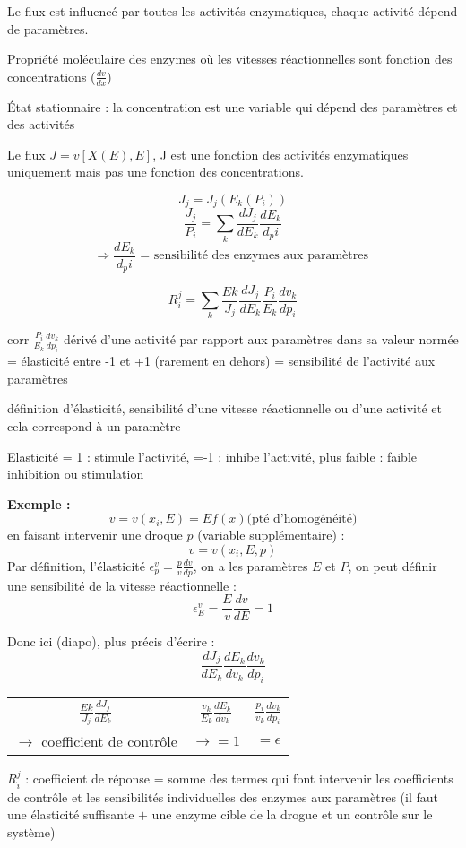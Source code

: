 Le flux est influencé par toutes les activités enzymatiques, chaque activité dépend de paramètres.

Propriété moléculaire des enzymes où les vitesses réactionnelles sont fonction des concentrations ($\frac{dv}{dx}$)

État stationnaire : la concentration est une variable qui dépend des paramètres et des activités

Le flux $J = v[X(E),E]$, J est une fonction des activités enzymatiques uniquement mais pas une fonction des concentrations. 
 	
$$ J_j = J_j(E_k(P_i))$$
$$ \frac{J_j}{P_i}= \sum_k \frac{dJ_j}{dE_k} \frac{dE_k}{d_pi} $$
$$ \Rightarrow \frac{dE_k}{d_pi}\text{ = sensibilité des enzymes aux paramètres }$$


$$ R^j_i = \sum_k \frac{Ek}{J_j}\frac{dJ_j}{dE_k}\frac{P_i}{E_k}\frac{dv_k}{dp_i}  $$

corr $\frac{P_i}{E_k}\frac{dv_k}{dp_i}$ dérivé d'une activité par rapport aux paramètres dans sa valeur normée = élasticité entre -1 et +1 (rarement en dehors) = sensibilité de l'activité aux paramètres 

\Rightarrow définition d'élasticité, sensibilité d'une vitesse réactionnelle ou d'une activité et cela correspond à un paramètre

Elasticité = 1 : stimule l'activité, =-1 : inhibe l'activité, plus faible : faible inhibition ou stimulation


\textbf{Exemple :}
$$ v = v(x_i, E) = E f(x) \text{(pté d'homogénéité)} $$
 en faisant intervenir une droque $p$ (variable supplémentaire) :
	$$ v = v(x_i, E, p) $$
Par définition, l'élasticité $\epsilon_p^v = \frac{p}{v} \frac{dv}{dp}$, on a les paramètres $E$ et $P$, on peut définir une sensibilité de la vitesse réactionnelle :
	$$ \epsilon_E^v = \frac{E}{v}\frac{dv}{dE}=1 $$

Donc ici (diapo), plus précis d'écrire :
	$$ \frac{dJ_j}{dE_k}\frac{dE_k}{dv_k}\frac{dv_k}{dp_i} $$
	
\begin{tabular}{c|c|c}
	$\frac{Ek}{J_j} \frac{dJ_j}{dE_k}$	&	$\frac{v_k}{E_k}\frac{dE_k}{dv_k}$	&	$\frac{p_i}{v_k}\frac{dv_k}{dp_i}$ \\
	$\rightarrow$ coefficient de contrôle	&	$\rightarrow =  1$	&	$ = \epsilon$ \\
\end{tabular} 



$R_i^j$ : coefficient de réponse = somme des termes qui font intervenir les coefficients de contrôle et les sensibilités individuelles des enzymes aux paramètres (il faut une élasticité suffisante $+$ une enzyme cible de la drogue et un contrôle sur le système)

